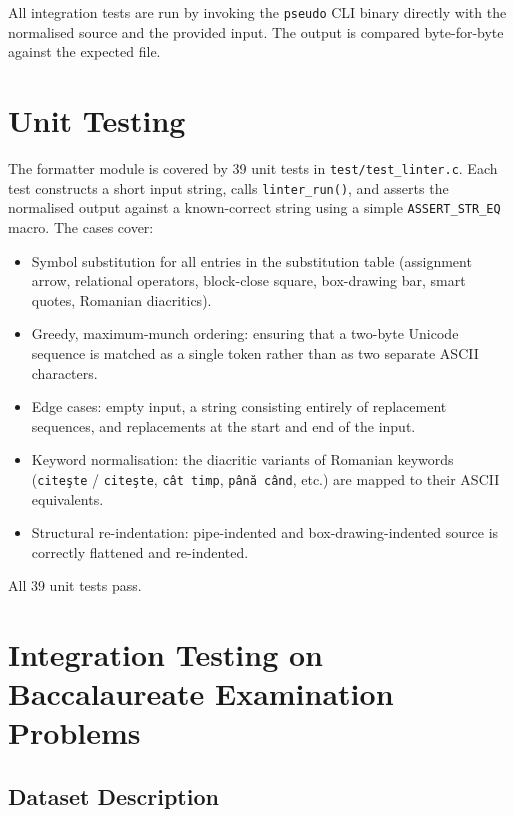 All integration tests are run by invoking the \texttt{pseudo} CLI binary
directly with the normalised source and the provided input.  The output is
compared byte-for-byte against the expected file.

\section{Unit Testing}
\label{sec:unit-tests}

The formatter module is covered by 39 unit tests in \texttt{test/test\_linter.c}.
Each test constructs a short input string, calls \texttt{linter\_run()}, and
asserts the normalised output against a known-correct string using a simple
\texttt{ASSERT\_STR\_EQ} macro.  The cases cover:

\begin{itemize}
  \item Symbol substitution for all entries in the substitution table
        (assignment arrow, relational operators, block-close square,
        box-drawing bar, smart quotes, Romanian diacritics).
  \item Greedy, maximum-munch ordering: ensuring that a two-byte Unicode
        sequence is matched as a single token rather than as two separate
        ASCII characters.
  \item Edge cases: empty input, a string consisting entirely of replacement
        sequences, and replacements at the start and end of the input.
  \item Keyword normalisation: the diacritic variants of Romanian keywords
        (\texttt{cite\c{s}te} / \texttt{cite\c{s}te}, \texttt{c\^{a}t~timp},
        \texttt{p\^{a}n\u{a}~c\^{a}nd}, etc.) are mapped to their
        ASCII equivalents.
  \item Structural re-indentation: pipe-indented and box-drawing-indented
        source is correctly flattened and re-indented.
\end{itemize}

All 39 unit tests pass.

\section{Integration Testing on Baccalaureate Examination Problems}
\label{sec:bac-tests}

\subsection{Dataset Description}
\label{subsec:dataset}

